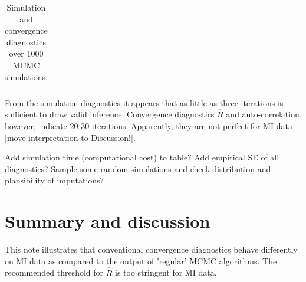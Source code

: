 \documentclass[article]{jss}
\begin{document}
\begin{table}[ht]
\begin{tabular}{lrrrrrrr}
   \hline
\end{tabular}
\caption{Simulation and convergence diagnostics over 1000 MCMC simulations.}
\label{subsetresults}
\end{table}

From the simulation diagnostics it appears that as little as three iterations is sufficient to draw valid inference. Convergence diagnostics $\widehat{R}$ and auto-correlation, however, indicate 20-30 iterations. Apparently, they are not perfect for MI data [move interpretation to Discussion!]. 

Add simulation time (computational cost) to table? Add empirical SE of all diagnostics? Sample some random simulations and check distribution and plausibility of imputations?








\section{Summary and discussion} \label{sec:summary}

This note illustrates that conventional convergence diagnostics behave differently on MI data as compared to the output of 'regular' MCMC algorithms. The recommended threshold for $\widehat{R}$ is too stringent for MI data.
\end{document}

